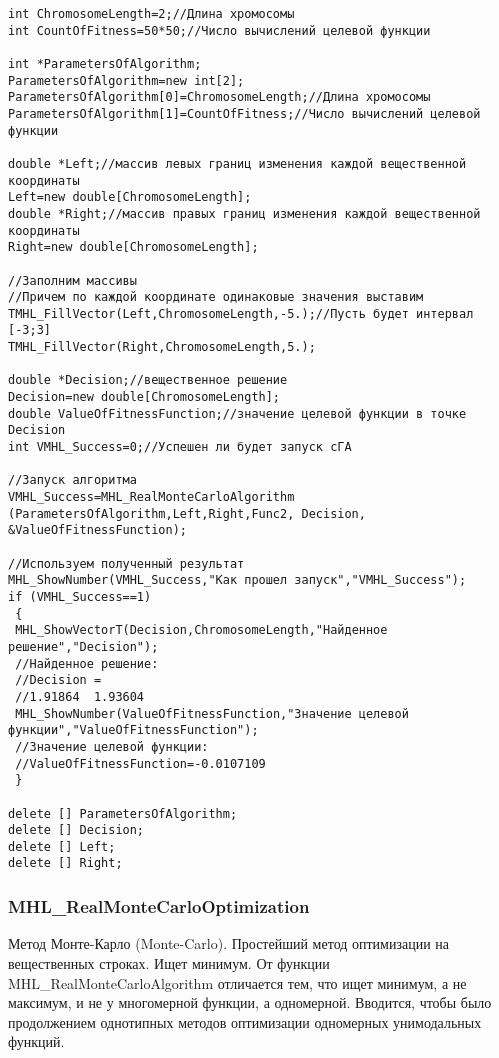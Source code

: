 \documentclass[a4paper,12pt]{article}
\begin{document}
\begin{lstlisting}[label=code_use_MHL_RealMonteCarloAlgorithm,caption=Пример использования]
int ChromosomeLength=2;//Длина хромосомы
int CountOfFitness=50*50;//Число вычислений целевой функции

int *ParametersOfAlgorithm;
ParametersOfAlgorithm=new int[2];
ParametersOfAlgorithm[0]=ChromosomeLength;//Длина хромосомы
ParametersOfAlgorithm[1]=CountOfFitness;//Число вычислений целевой функции

double *Left;//массив левых границ изменения каждой вещественной координаты
Left=new double[ChromosomeLength];
double *Right;//массив правых границ изменения каждой вещественной координаты
Right=new double[ChromosomeLength];

//Заполним массивы
//Причем по каждой координате одинаковые значения выставим
TMHL_FillVector(Left,ChromosomeLength,-5.);//Пусть будет интервал [-3;3]
TMHL_FillVector(Right,ChromosomeLength,5.);

double *Decision;//вещественное решение
Decision=new double[ChromosomeLength];
double ValueOfFitnessFunction;//значение целевой функции в точке Decision
int VMHL_Success=0;//Успешен ли будет запуск cГА

//Запуск алгоритма
VMHL_Success=MHL_RealMonteCarloAlgorithm (ParametersOfAlgorithm,Left,Right,Func2, Decision, &ValueOfFitnessFunction);

//Используем полученный результат
MHL_ShowNumber(VMHL_Success,"Как прошел запуск","VMHL_Success");
if (VMHL_Success==1)
 {
 MHL_ShowVectorT(Decision,ChromosomeLength,"Найденное решение","Decision");
 //Найденное решение:
 //Decision =	
 //1.91864	1.93604
 MHL_ShowNumber(ValueOfFitnessFunction,"Значение целевой функции","ValueOfFitnessFunction");
 //Значение целевой функции:
 //ValueOfFitnessFunction=-0.0107109
 }

delete [] ParametersOfAlgorithm;
delete [] Decision;
delete [] Left;
delete [] Right;
\end{lstlisting}

\subsubsection{MHL\_RealMonteCarloOptimization}\label{MHL_RealMonteCarloOptimization}

Метод Монте-Карло (Monte-Carlo). Простейший метод оптимизации на вещественных строках. Ищет минимум. От функции MHL\_RealMonteCarloAlgorithm отличается тем, что ищет минимум, а не максимум, и не у многомерной функции, а одномерной. Вводится, чтобы было продолжением однотипных методов оптимизации одномерных унимодальных функций.
\end{document}
